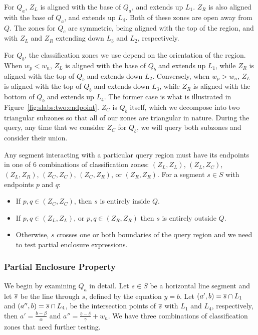 For $Q_a$, $Z_L$ is aligned with the base of $Q_a$, and extends up $L_1$. 
$Z_R$ is also aligned with the base of $Q_a$, and extends up $L_4$.
Both of these zones are open away from $Q$.
The zones for $Q_c$ are symmetric, being aligned with the top of the region, and with $Z_L$ and $Z_R$ extending down $L_3$ and $L_2$, respectively.

For $Q_b$, the classification zones we use depend on the orientation of the region.
When $w_p < w_n$, $Z_L$ is aligned with the base of $Q_b$ and extends up $L_1$, while $Z_R$ is aligned with the top of $Q_b$ and extends down $L_2$.
Conversely, when $w_p > w_n$, $Z_L$ is aligned with the top of $Q_b$ and extends down $L_3$, while $Z_R$ is aligned with the bottom of $Q_b$ and extends up $L_4$.
The former case is what is illustrated in Figure~\ref{fig:slabs:two:endpoint}.
$Z_C$ is $Q_b$ itself, which we decompose into two triangular subzones so that all of our zones are triangular in nature.
During the query, any time that we consider $Z_C$ for $Q_b$, we will query both subzones and consider their union.

Any segment interacting with a particular query region must have its endpoints in one of 6 combinations of classification zones: $(Z_L, Z_L)$, $(Z_L, Z_C)$, $(Z_L, Z_R)$, $(Z_C, Z_C)$, $(Z_C, Z_R)$, or $(Z_R, Z_R)$. 
For a segment $s \in S$ with endpoints $p$ and $q$:
\begin{itemize}
\item If $p, q \in (Z_C, Z_C)$, then $s$ is entirely inside $Q$.
\item If $p, q \in (Z_L, Z_L)$, or $p, q \in (Z_R, Z_R)$ then $s$ is entirely outside $Q$.
\item Otherwise, $s$ crosses one or both boundaries of the query region and we need to test partial enclosure expressions.
\end{itemize}


\subsubsection{Partial Enclosure Property}

We begin by examining $Q_a$ in detail.
Let $s \in S$ be a horizontal line segment and let $\overline{s}$ be the line through $s$, defined by the equation $y = b$.
Let $(a', b) = \overline{s} \cap L_1$ and $(a'', b) = \overline{s} \cap L_4$, be the intersection points of $\overline{s}$ with $L_1$ and $L_4$, respectively, then $a' = \frac{b - \beta}{\alpha}$ and $a'' = \frac{b - \delta}{\gamma} + w_n$.
We have three combinations of classification zones that need further testing.

